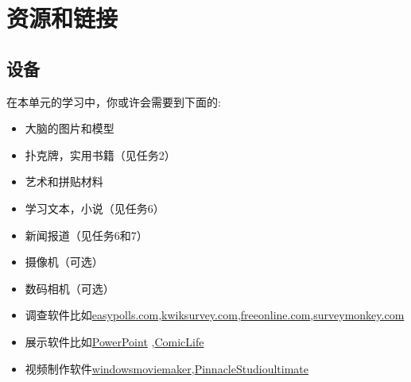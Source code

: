 \chapter{资源和链接}


\section{设备}
   在本单元的学习中，你或许会需要到下面的:\par
   \begin{itemize}
     \item 大脑的图片和模型 
     \item 扑克牌，实用书籍（见任务2）
     \item 艺术和拼贴材料 
     \item 学习文本，小说（见任务6） 
     \item 新闻报道（见任务6和7）
     \item 摄像机（可选）
     \item 数码相机（可选）
     \item 调查软件比如\href{easypolls.net}{easypolls.com},\href{kwiksurveys.com}{kwiksurvey.com},\href{freeonlinesurveys.com}{freeonline.com},\href{surveymonkey.com}{surveymonkey.com}
     \item 展示软件比如\href{microsoft.com) }{PowerPoint} ,\href{plasq.com/products/comiclife/}{ComicLife}
     \item 视频制作软件\href{microsoft. com}{windowsmoviemaker},\href{pinnaclesys.com}{PinnacleStudioultimate}  
   \end{itemize}  


